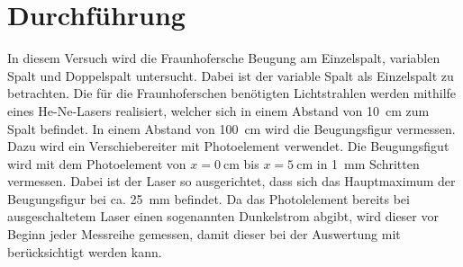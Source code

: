 
\section{Durchführung}

In diesem Versuch wird die Fraunhofersche Beugung am Einzelspalt,
variablen Spalt und Doppelspalt untersucht. Dabei ist der variable Spalt
als Einzelspalt zu betrachten.  Die für die Fraunhoferschen benötigten
Lichtstrahlen werden mithilfe eines He-Ne-Lasers realisiert, welcher
sich in einem Abstand von \SI{10}{\centi\metre} zum Spalt befindet. In
einem Abstand von \SI{100}{\centi\metre} wird die Beugungsfigur
vermessen. Dazu wird ein Verschiebereiter mit Photoelement
verwendet. Die Beugungsfigut wird mit dem Photoelement von $x=
\SI{0}{\centi\metre}$ bis $x = \SI{5}{\centi\metre}$ in
\SI{1}{\milli\metre} Schritten vermessen. Dabei ist der Laser so
ausgerichtet, dass sich das Hauptmaximum der Beugungsfigur bei
ca. \SI{25}{\milli\metre} befindet. Da das Photolelement bereits bei
ausgeschaltetem Laser einen sogenannten Dunkelstrom abgibt, wird dieser
vor Beginn jeder Messreihe gemessen, damit dieser bei der Auswertung mit
berücksichtigt werden kann.
